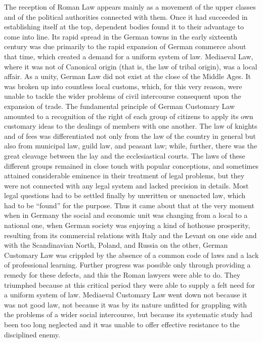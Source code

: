 \documentclass{book}
\begin{document}
The reception of Roman Law appears mainly as a movement of the upper classes and of the political authorities connected with them. Once it had succeeded in establishing itself at the top, dependent bodies found it to their advantage to come into line. Its rapid spread in the German towns in the early sixteenth century was due primarily to the rapid expansion of German commerce about that time, which created a demand for a uniform system of law. Mediaeval Law, where it was not of Canonical origin (that is, the law of tribal origin), was a local affair. As a unity, German Law did not exist at the close of the Middle Ages. It was broken up into countless local customs, which, for this very reason, were unable to tackle the wider problems of civil intercourse consequent upon the expansion of trade. The fundamental principle of German Customary Law amounted to a recognition of the right of each group of citizens to apply its own customary ideas to the dealings of members with one another. The law of knights and of fees was differentiated not only from the law of the country in general but also from municipal law, guild law, and peasant law; while, further, there was the great cleavage between the lay and the ecclesiastical courts. The laws of these different groups remained in close touch with popular conceptions, and sometimes attained considerable eminence in their treatment of legal problems, but they were not connected with any legal system and lacked precision in details. Most legal questions had to be settled finally by unwritten or unenacted law, which had to be “found” for the purpose. Thus it came about that at the very moment when in Germany the social and economic unit was changing from a local to a national one, when German society was enjoying a kind of hothouse prosperity, resulting from its commercial relations with Italy and the Levant on one side and with the Scandinavian North, Poland, and Russia on the other, German Customary Law was crippled by the absence of a common code of laws and a lack of professional learning. Further progress was possible only through providing a remedy for these defects, and this the Roman lawyers were able to do. They triumphed because at this critical period they were able to supply a felt need for a uniform system of law. Mediaeval Customary Law went down not because it was not good law, not because it was by its nature unfitted for grappling with the problems of a wider social intercourse, but because its systematic study had been too long neglected and it was unable to offer effective resistance to the disciplined enemy.\footnotemark[6]
\end{document}
